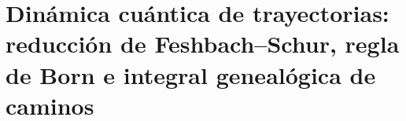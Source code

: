 \chapter{Dinámica cuántica de trayectorias: reducción de Feshbach--Schur, regla de Born e integral genealógica de caminos}
\label{chap:md-trayectorias-cuanticas-definitivo}


\begingroup
\let\HMTOwnerSection\section
\let\HMTOwnerSubsection\subsection
\let\HMTOwnerSubsubsection\subsubsection
\let\HMTOwnerParagraph\paragraph
\let\chapter\HMTOwnerSection
\let\section\HMTOwnerSubsection
\let\subsection\HMTOwnerSubsubsection
\let\subsubsection\HMTOwnerParagraph

\endgroup
\begingroup
\let\HMTOwnerSection\section
\let\HMTOwnerSubsection\subsection
